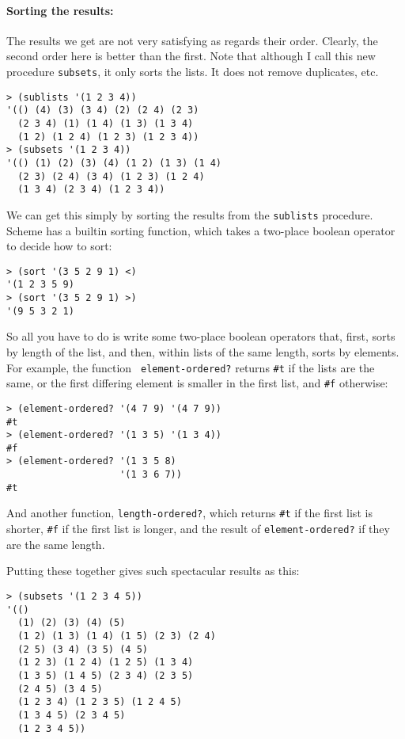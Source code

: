 \documentclass[letterpaper,12pt]{article}
\begin{document}
\begin{multicols}{2}
  \paragraph{Sorting the results:}
  The results we get are not very satisfying as regards their order.  Clearly,
  the second order here is better than the first.  Note that although I call
  this new procedure \texttt{subsets}, it only sorts the lists.  It does not
  remove duplicates, etc.
  {\small
\begin{Verbatim}[frame=single]
> (sublists '(1 2 3 4))
'(() (4) (3) (3 4) (2) (2 4) (2 3) 
  (2 3 4) (1) (1 4) (1 3) (1 3 4) 
  (1 2) (1 2 4) (1 2 3) (1 2 3 4))
> (subsets '(1 2 3 4))
'(() (1) (2) (3) (4) (1 2) (1 3) (1 4)
  (2 3) (2 4) (3 4) (1 2 3) (1 2 4) 
  (1 3 4) (2 3 4) (1 2 3 4))
\end{Verbatim}
  }
  We can get this simply by sorting the results from the {\tt sublists}
  procedure.  Scheme has a builtin sorting function, which takes a
  two-place boolean operator to decide how to sort:
  {\small
\begin{Verbatim}[frame=single]
> (sort '(3 5 2 9 1) <)
'(1 2 3 5 9)
> (sort '(3 5 2 9 1) >)
'(9 5 3 2 1)
\end{Verbatim}
    }
  So all you have to do is write some two-place boolean operators that,
  first, sorts by length of the list, and then, within lists of the same
  length, sorts by elements.  For example, the function {\tt
    element-ordered?} returns \verb|#t| if the lists are the same, or
  the first differing element is smaller in the first list, and
  \verb|#f| otherwise:
  {\small
\begin{Verbatim}[frame=single]
> (element-ordered? '(4 7 9) '(4 7 9))
#t
> (element-ordered? '(1 3 5) '(1 3 4))
#f
> (element-ordered? '(1 3 5 8) 
                    '(1 3 6 7))
#t
\end{Verbatim}
    }
  And another function, {\tt length-ordered?}, which returns \verb|#t|
  if the first list is shorter, \verb|#f| if the first list is
  longer, and the result of {\tt element-ordered?} if they are the same
  length. 

  Putting these together gives such spectacular results as this:
  {\small
\begin{Verbatim}[frame=single]
> (subsets '(1 2 3 4 5))
'(()
  (1) (2) (3) (4) (5)
  (1 2) (1 3) (1 4) (1 5) (2 3) (2 4)
  (2 5) (3 4) (3 5) (4 5)
  (1 2 3) (1 2 4) (1 2 5) (1 3 4)
  (1 3 5) (1 4 5) (2 3 4) (2 3 5)
  (2 4 5) (3 4 5)
  (1 2 3 4) (1 2 3 5) (1 2 4 5)
  (1 3 4 5) (2 3 4 5)
  (1 2 3 4 5))
\end{Verbatim}
  }
\end{multicols}
\end{document}
